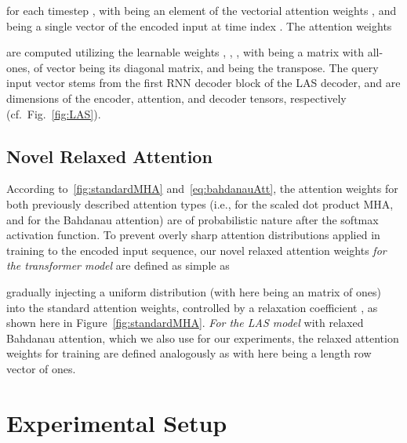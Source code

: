 \documentclass{article}
\begin{document}
for each timestep , with  being an element of the vectorial attention weights ,  and  being a single vector of the encoded input   at time index . The attention weights
\vspace{-1mm}

are computed utilizing the learnable weights , , , with  being a  matrix with all-ones,  of  vector  being its  diagonal matrix, and  being the transpose. The query input vector  stems from the first RNN decoder block of the LAS decoder, and  are dimensions of the encoder, attention, and decoder tensors, respectively (cf.\ Fig.~\ref{fig:LAS}).


\subsection{Novel Relaxed Attention}\vspace{-2mm}
According to~\eqref{fig:standardMHA} and~\eqref{eq:bahdanauAtt}, the attention weights for both previously described attention types (i.e.,  for the scaled dot product MHA, and  for the Bahdanau attention) are of probabilistic nature after the softmax activation function. To prevent overly sharp attention distributions applied in training to the encoded input sequence, our novel relaxed attention weights \textit{for the transformer model} are defined as simple as

 gradually injecting a uniform distribution (with  here being an  matrix of ones) into the standard attention weights, controlled by a relaxation coefficient , as shown here in Figure~\ref{fig:standardMHA}. \textit{For the LAS model} with relaxed Bahdanau attention, which we also use for our experiments, the relaxed attention weights for training are defined analogously as 
\vspace{-1mm}
with  here being a length  row vector of ones.


\vspace{-1mm}

\section{Experimental Setup}\vspace{-3mm}
\end{document}
